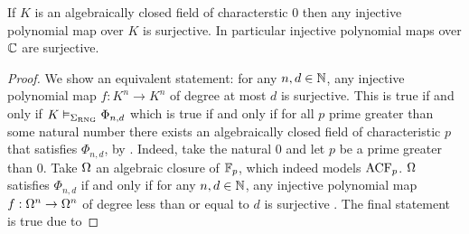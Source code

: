 \begin{prop}[Ax-Grothendieck]
    If $K$ is an algebraically closed field of characterstic $0$
    then any injective polynomial map over $K$ is surjective.
    In particular injective polynomial maps over $\mathbb{C}$ are surjective.
\end{prop}
\begin{proof}
    We show an equivalent statement:
    for any $n, d \in \mathbb{N}$, any injective polynomial map $f : K^n \to K^n$ 
    of degree at most $d$ is surjective.
    This is true if and only if $K \vDash_{\Sigma_{\mathrm{RNG}}} \Phi_{n,d}$
    which is true if and only if 
    for all $p$ prime greater than some natural number there exists 
    an algebraically closed field of characteristic $p$ that satisfies 
    $\Phi_{n,d}$, by .
    Indeed, take the natural $0$ and let $p$ be a prime greater than $0$.
    Take $\Omega$ an algebraic closure of $\mathbb{F}_p$, 
    which indeed models $\operatorname{ACF}_p$.
    $\Omega$ satisfies $\Phi_{n,d}$ if and only if
    for any $n, d \in \mathbb{N}$, any injective polynomial map $f : \Omega^n \to \Omega^n$ 
    of degree less than or equal to $d$ is surjective  
    .
    The final statement is true due to 
\end{proof}

